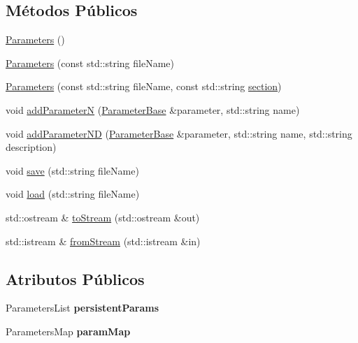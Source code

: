 \subsection*{Métodos Públicos}
\begin{DoxyCompactItemize}
\item 
\hyperlink{class_parameters_af4d94ee360ac0157d9065f78797fe9a1}{Parameters} ()
\item 
\hyperlink{class_parameters_aae839af2aa8d237c6b1e319ae183c982}{Parameters} (const std\-::string file\-Name)
\item 
\hyperlink{class_parameters_ac1be7d84f9e7420060cd6687c363f2dc}{Parameters} (const std\-::string file\-Name, const std\-::string \hyperlink{class_c_f_g_file_object_a7d62f5a9b853173c9d36e315c3de21b3}{section})
\item 
void \hyperlink{class_parameters_aa78d6772157b43e282a55f7e58fe0520}{add\-Parameter\-N} (\hyperlink{class_parameter_base}{Parameter\-Base} \&parameter, std\-::string name)
\item 
void \hyperlink{class_parameters_af902e19a21efb49f10287a79b624d562}{add\-Parameter\-N\-D} (\hyperlink{class_parameter_base}{Parameter\-Base} \&parameter, std\-::string name, std\-::string description)
\item 
void \hyperlink{class_parameters_a4d75e79740800b08f710657fa0e461a3}{save} (std\-::string file\-Name)
\item 
void \hyperlink{class_parameters_af77f073dabbbf334d8cb1a44f777cd73}{load} (std\-::string file\-Name)
\item 
std\-::ostream \& \hyperlink{class_parameters_a236265efb331f30fe0742cb1d12c22ab}{to\-Stream} (std\-::ostream \&out)
\item 
std\-::istream \& \hyperlink{class_parameters_a1ca5a29b4ebd5a0c2a959ea28353ce07}{from\-Stream} (std\-::istream \&in)
\end{DoxyCompactItemize}
\subsection*{Atributos Públicos}
\begin{DoxyCompactItemize}
\item 
\hypertarget{class_parameters_a9d40577daab86250d56cabfda9358e37}{Parameters\-List {\bfseries persistent\-Params}}\label{class_parameters_a9d40577daab86250d56cabfda9358e37}

\item 
\hypertarget{class_parameters_a77e1c23c11fe877234f6e31eafbd102a}{Parameters\-Map {\bfseries param\-Map}}\label{class_parameters_a77e1c23c11fe877234f6e31eafbd102a}

\end{DoxyCompactItemize}
